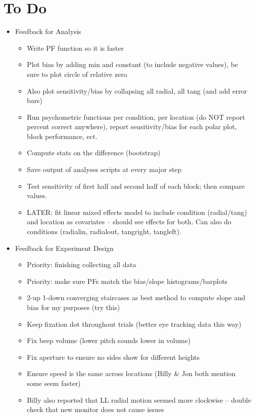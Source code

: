 \documentclass[11pt]{article} %
\begin{document}
\section{To Do} 
\begin{itemize}
\item Feedback for Analysis
	\begin{itemize}
	\item Write PF function so it is faster
	\item Plot bias by adding min and constant (to include negative values), be sure to plot circle of relative zero
	\item Also plot sensitivity/bias by collapsing all radial, all tang (and add error bars)
	\item Run psychometric functions per condition, per location (do NOT report percent correct anywhere), report sensitivity/bias for each polar plot, block performance, ect.
	\item Compute stats on the difference (bootstrap)
	\item Save output of analyses scripts at every major step
	\item Test sensitivity of first half and second half of each block; then compare values.
	\item LATER: fit linear mixed effects model to include condition (radial/tang) and location as covariates -- should see effects for both. Can also do conditions (radialin, radialout, tangright, tangleft).
	\end{itemize}
\item Feedback for Experiment Design
	\begin{itemize}
	\item Priority: finishing collecting all data
	\item Priority: make sure PFs match the bias/slope histograms/barplots
	\item 2-up 1-down converging staircases as best method to compute slope and bias for my purposes (try this)
	\item Keep fixation dot throughout trials (better eye tracking data this way)
	\item Fix beep volume (lower pitch sounds lower in volume)
	\item Fix aperture to ensure no sides show for different heights
	\item Ensure speed is the same across locations (Billy \& Jon both mention some seem faster)
	\item Billy also reported that LL radial motion seemed more clockwise -- double check that new monitor does not cause issues

\end{itemize}
\end{itemize}
\end{document}
